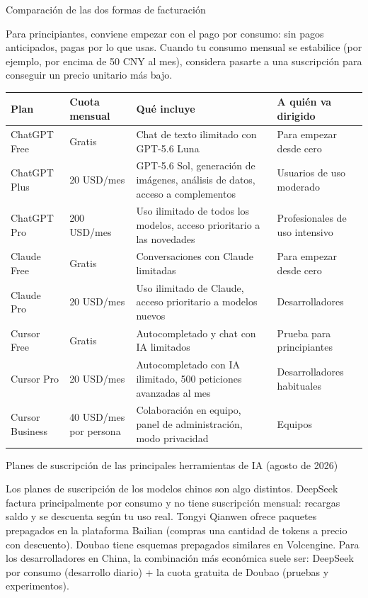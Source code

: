 \begin{center}\small\color{gray}Comparación de las dos formas de facturación\end{center}

Para principiantes, conviene empezar con el pago por consumo: sin pagos anticipados, pagas por lo que usas. Cuando tu consumo mensual se estabilice (por ejemplo, por encima de 50 CNY al mes), considera pasarte a una suscripción para conseguir un precio unitario más bajo.


\begin{center}
\begin{tabularx}{\linewidth}{|X|X|X|X|}
\hline
\textbf{Plan} & \textbf{Cuota mensual} & \textbf{Qué incluye} & \textbf{A quién va dirigido} \tabularnewline
\hline
ChatGPT Free & Gratis & Chat de texto ilimitado con GPT-5.6 Luna & Para empezar desde cero \tabularnewline
ChatGPT Plus & 20 USD/mes & GPT-5.6 Sol, generación de imágenes, análisis de datos, acceso a complementos & Usuarios de uso moderado \tabularnewline
ChatGPT Pro & 200 USD/mes & Uso ilimitado de todos los modelos, acceso prioritario a las novedades & Profesionales de uso intensivo \tabularnewline
Claude Free & Gratis & Conversaciones con Claude limitadas & Para empezar desde cero \tabularnewline
Claude Pro & 20 USD/mes & Uso ilimitado de Claude, acceso prioritario a modelos nuevos & Desarrolladores \tabularnewline
Cursor Free & Gratis & Autocompletado y chat con IA limitados & Prueba para principiantes \tabularnewline
Cursor Pro & 20 USD/mes & Autocompletado con IA ilimitado, 500 peticiones avanzadas al mes & Desarrolladores habituales \tabularnewline
Cursor Business & 40 USD/mes por persona & Colaboración en equipo, panel de administración, modo privacidad & Equipos \tabularnewline
\hline
\end{tabularx}
\end{center}

\begin{center}\small\color{gray}Planes de suscripción de las principales herramientas de IA (agosto de 2026)\end{center}

Los planes de suscripción de los modelos chinos son algo distintos. DeepSeek factura principalmente por consumo y no tiene suscripción mensual: recargas saldo y se descuenta según tu uso real. Tongyi Qianwen ofrece paquetes prepagados en la plataforma Bailian (compras una cantidad de tokens a precio con descuento). Doubao tiene esquemas prepagados similares en Volcengine. Para los desarrolladores en China, la combinación más económica suele ser: DeepSeek por consumo (desarrollo diario) + la cuota gratuita de Doubao (pruebas y experimentos).


